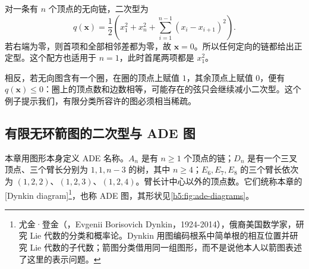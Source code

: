 对一条有 \(n\) 个顶点的无向链，二次型为
\begin{equation}\label{b5:eq:chain-positive-form}
	q(\mathbf x)=\frac12\left(x_1^2+x_n^2+ \sum_{i=1}^{n-1}(x_i-x_{i+1})^2\right).
\end{equation}
若右端为零，则首项和全部相邻差都为零，故 \(\mathbf x=0\)。所以任何定向的链都给出正定型。这个配方也适用于 \(n=1\)，此时首尾两项都是 \(x_1^2\)。

\ProseParagraphBreak

相反，若无向图含有一个圈，在圈的顶点上赋值 \(1\)，其余顶点上赋值 \(0\)，便有 \(q(\mathbf x)\leq0\)：圈上的顶点数和边数相等，可能存在的弦只会继续减小二次型。这个例子提示我们，有限分类所容许的图必须相当稀疏。

\subsection{有限无环箭图的二次型与 ADE 图}
\label{b5:subsec:1001:04}

本章用图形本身定义 ADE 名称。\(A_n\) 是有 \(n\geq1\) 个顶点的链；\(D_n\) 是有一个三叉顶点、三个臂长分别为 \(1,1,n-3\) 的树，其中 \(n\geq4\)；\(E_6,E_7,E_8\) 的三个臂长依次为 \((1,2,2)\)、\((1,2,3)\)、\((1,2,4)\)。臂长计中心以外的顶点数。它们统称本章的[Dynkin diagram]\footnote{尤金·登金（，Evgenii Borisovich Dynkin，1924-2014），俄裔美国数学家，研究 Lie 代数的分类和概率论。Dynkin 用图编码根系中简单根的相互位置并研究 Lie 代数的子代数；箭图分类借用同一组图形，而不是说他本人以箭图表述了这里的表示问题。}，也称 ADE 图，其形状见\cref{b5:fig:ade-diagrams}。



